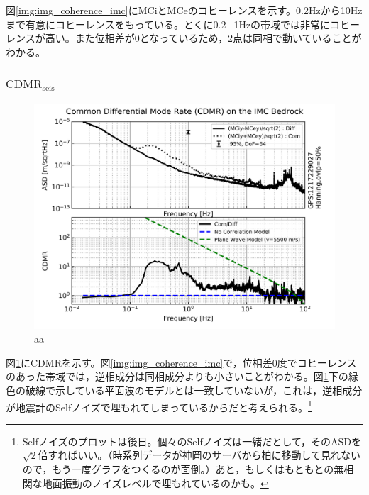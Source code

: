 図\ref{img:img_coherence_imc}にMCiとMCeのコヒーレンスを示す。0.2Hzから10Hzまで有意にコヒーレンスをもっている。とくに0.2−1Hzの帯域では非常にコヒーレンスが高い。また位相差が0となっているため，2点は同相で動いていることがわかる。



\subsubsection{$\mathrm{CDMR_{seis}}$}
\begin{figure}[H]
  \begin{center}
    \includegraphics[width=11.5cm]{./cdmr/cdmr_imc.png}
  \end{center}
  \caption{aa}\label{img:img_cdmr_imc}
\end{figure}
図\ref{img:img_cdmr_imc}にCDMRを示す。図\ref{img:img_coherence_imc}で，位相差0度でコヒーレンスのあった帯域では，逆相成分は同相成分よりも小さいことがわかる。図\ref{img:img_cdmr_imc}下の緑色の破線で示している平面波のモデルとは一致していないが，これは，逆相成分が地震計のSelfノイズで埋もれてしまっているからだと考えられる。\footnote[12]{Selfノイズのプロットは後日。個々のSelfノイズは一緒だとして，そのASDを$\sqrt{2}$倍すればいい。（時系列データが神岡のサーバから柏に移動して見れないので，もう一度グラフをつくるのが面倒。）あと，もしくはもともとの無相関な地面振動のノイズレベルで埋もれているのかも。}





